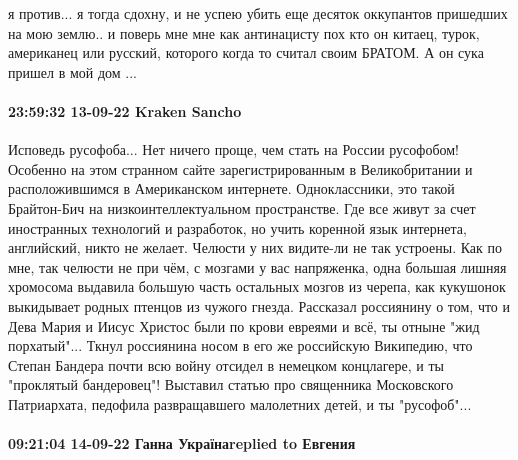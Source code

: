 я против... я тогда сдохну, и не успею убить еще десяток оккупантов пришедших
на мою землю.. и поверь мне мне как антинацисту пох кто он китаец, турок,
американец или русский, которого когда то считал своим БРАТОМ. А он сука пришел
в мой дом ...

\paragraph{23:59:32 13-09-22 Kraken Sancho}

Исповедь русофоба...
Нет ничего проще, чем стать на России русофобом! Особенно на этом странном сайте зарегистрированным в Великобритании и расположившимся в Американском интернете. Одноклассники, это такой Брайтон-Бич на низкоинтеллектуальном пространстве. Где все живут за счет иностранных технологий и разработок, но учить коренной язык интернета, английский, никто не желает. Челюсти у них видите-ли не так устроены. Как по мне, так челюсти не при чём, с мозгами у вас напряженка, одна большая лишняя хромосома выдавила большую часть остальных мозгов из черепа, как кукушонок выкидывает родных птенцов из чужого гнезда.
Рассказал россиянину о том, что и Дева Мария и Иисус Христос были по крови евреями и всё, ты отныне "жид порхатый"...
Ткнул россиянина носом в его же российскую Википедию, что Степан Бандера почти всю войну отсидел в немецком концлагере, и ты "проклятый бандеровец"!
Выставил статью про священника Московского Патриархата, педофила развращавшего малолетних детей, и ты "русофоб"...

\paragraph{09:21:04 14-09-22 Ганна Українаreplied to Евгения}

